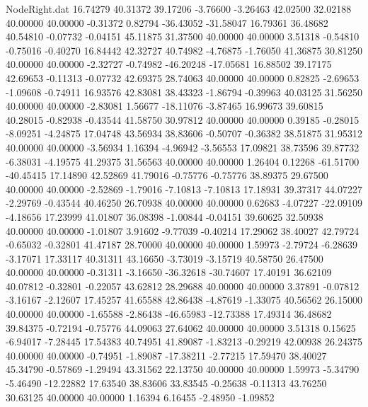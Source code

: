 \begin{filecontents}{NodeRight.dat}
  16.74279   40.31372   39.17206    -3.76600   -3.26463   42.02500   32.02188   40.00000   40.00000   -0.31372    0.82794  -36.43052  -31.58047
  16.79361   36.48682   40.54810    -0.07732   -0.04151   45.11875   31.37500   40.00000   40.00000    3.51318   -0.54810   -0.75016   -0.40270
  16.84442   42.32727   40.74982    -4.76875   -1.76050   41.36875   30.81250   40.00000   40.00000   -2.32727   -0.74982  -46.20248  -17.05681
  16.88502   39.17175   42.69653    -0.11313   -0.07732   42.69375   28.74063   40.00000   40.00000    0.82825   -2.69653   -1.09608   -0.74911
  16.93576   42.83081   38.43323    -1.86794   -0.39963   40.03125   31.56250   40.00000   40.00000   -2.83081    1.56677  -18.11076   -3.87465
  16.99673   39.60815   40.28015    -0.82938   -0.43544   41.58750   30.97812   40.00000   40.00000    0.39185   -0.28015   -8.09251   -4.24875
  17.04748   43.56934   38.83606    -0.50707   -0.36382   38.51875   31.95312   40.00000   40.00000   -3.56934    1.16394   -4.96942   -3.56553
  17.09821   38.73596   39.87732    -6.38031   -4.19575   41.29375   31.56563   40.00000   40.00000    1.26404    0.12268  -61.51700  -40.45415
  17.14890   42.52869   41.79016    -0.75776   -0.75776   38.89375   29.67500   40.00000   40.00000   -2.52869   -1.79016   -7.10813   -7.10813
  17.18931   39.37317   44.07227    -2.29769   -0.43544   40.46250   26.70938   40.00000   40.00000    0.62683   -4.07227  -22.09109   -4.18656
  17.23999   41.01807   36.08398    -1.00844   -0.04151   39.60625   32.50938   40.00000   40.00000   -1.01807    3.91602   -9.77039   -0.40214
  17.29062   38.40027   42.79724    -0.65032   -0.32801   41.47187   28.70000   40.00000   40.00000    1.59973   -2.79724   -6.28639   -3.17071
  17.33117   40.31311   43.16650    -3.73019   -3.15719   40.58750   26.47500   40.00000   40.00000   -0.31311   -3.16650  -36.32618  -30.74607
  17.40191   36.62109   40.07812    -0.32801   -0.22057   43.62812   28.29688   40.00000   40.00000    3.37891   -0.07812   -3.16167   -2.12607
  17.45257   41.65588   42.86438    -4.87619   -1.33075   40.56562   26.15000   40.00000   40.00000   -1.65588   -2.86438  -46.65983  -12.73388
  17.49314   36.48682   39.84375    -0.72194   -0.75776   44.09063   27.64062   40.00000   40.00000    3.51318    0.15625   -6.94017   -7.28445
  17.54383   40.74951   41.89087    -1.83213   -0.29219   42.00938   26.24375   40.00000   40.00000   -0.74951   -1.89087  -17.38211   -2.77215
  17.59470   38.40027   45.34790    -0.57869   -1.29494   43.31562   22.13750   40.00000   40.00000    1.59973   -5.34790   -5.46490  -12.22882
  17.63540   38.83606   33.83545    -0.25638   -0.11313   43.76250   30.63125   40.00000   40.00000    1.16394    6.16455   -2.48950   -1.09852

\end{filecontents}
